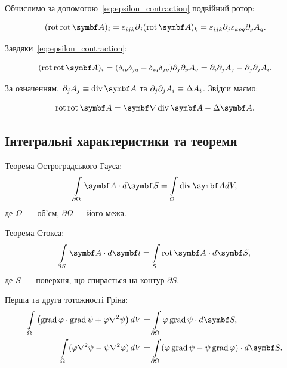 Обчислимо за допомогою~\eqref{eq:epsilon_contraction} подвійний ротор:

\begin{equation*}
(\Rot \Rot \vect{A})_i = \epsilon_{ijk} \partial_j (\Rot \vect{A})_k = \epsilon_{ijk} \partial_j \epsilon_{kpq} \partial_p A_q.
\end{equation*}

Завдяки~\eqref{eq:epsilon_contraction}:

\begin{equation*}
(\Rot \Rot \vect{A})_i = (\delta_{ip} \delta_{jq} - \delta_{iq} \delta_{jp}) \partial_j \partial_p A_q = \partial_i \partial_j A_j - \partial_j
\partial_j A_i.
\end{equation*}

За означенням, \(\partial_j A_j \equiv \Div \vect{A}\) та \(\partial_j \partial_j A_i \equiv \Delta A_i\). Звідси маємо:

\begin{equation*}
\Rot \Rot \vect{A} = \grad \Div \vect{A} - \Laplasian \vect{A}.
\end{equation*}

\subsection{Інтегральні характеристики та теореми}\label{sec:int_theorems}\hypertarget{ector-integral-theorems}{}

Теорема Ос\-тро\-град\-сько\-го-Гауса:
\begin{equation}\label{OGTheorem}
	\int\limits_{\partial \Omega} \vect{A}\cdot d\vect{S} = \int\limits_{\Omega} \Div\vect{A} dV,
\end{equation}
де $\Omega$~--- об'єм, $\partial\Omega$ --- його межа.

Теорема Стокса:
\begin{equation}\label{Stoksheorem}
	\int\limits_{\partial S} \vect{A}\cdot d\vect{l} = \int\limits_S \Rot\vect{A} \cdot d\vect{S},
\end{equation}
де $S$~--- поверхня, що спирається на контур $\partial S$.

Перша та друга тотожності Гріна:
\begin{align}
    \int\limits_{\Omega} \left( \Grad\phi \cdot \Grad\psi + \phi \nabla^2\psi \right) dV &= \int\limits_{\partial \Omega} \phi \Grad\psi \cdot d\vect{S}, \label{Grin1} \\
    \int\limits_{\Omega} (\phi \nabla^2\psi - \psi \nabla^2\phi)\, dV &= \int\limits_{\partial \Omega} (\phi \Grad\psi - \psi \Grad\phi) \cdot d\vect{S}. \label{Grin2}
\end{align}
